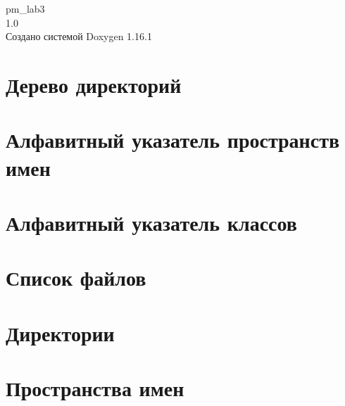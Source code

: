 \documentclass[twoside]{book}
\newcommand{\+}{\discretionary{\mbox{\scriptsize$\hookleftarrow$}}{}{}}
\newcommand{\clearemptydoublepage}{%
    \newpage{\pagestyle{empty}\cleardoublepage}%
  }
\begin{document}
  \raggedbottom
    \hypersetup{pageanchor=false,
                bookmarksnumbered=true,
                pdfencoding=unicode
               }
  \begin{titlepage}
  \vspace*{7cm}
  \begin{center}%
  {\Large pm\+\_\+lab3}\\
  [1ex]\large 1.\+0 \\
  \vspace*{1cm}
  {\large Создано системой Doxygen 1.16.1}\\
  \end{center}
  \end{titlepage}
  \clearemptydoublepage
  \tableofcontents
  \clearemptydoublepage
  \hypersetup{pageanchor=true}

\chapter{Дерево директорий}

\chapter{Алфавитный указатель пространств имен}

\chapter{Алфавитный указатель классов}

\chapter{Список файлов}

\chapter{Директории}







\chapter{Пространства имен}


\end{document}
